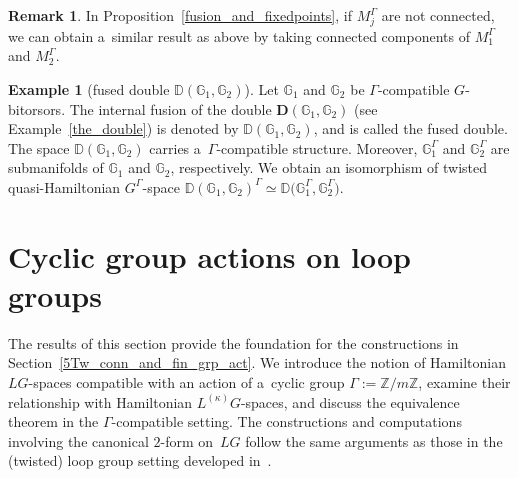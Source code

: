 \documentclass[10pt,a4paper]{amsart}
\numberwithin{equation}{section}
\theoremstyle{definition}
\newtheorem{Example}[Theorem]{Example}
\newtheorem{Remark}[Theorem]{Remark}
\newcommand{\bG}{\mathbb{G}}
\newcommand{\bD}{\mathbb{D}}
\newcommand{\bZ}{\mathbb{Z}}
\begin{document}
\begin{Remark}
 In Proposition~\ref{fusion_and_fixedpoints}, if $M_j^{\Gamma}$ are not connected, we can obtain a~similar result as above by taking connected components of $M_1^{\Gamma}$ and $M_2^{\Gamma}$.
\end{Remark}

\begin{Example}[fused double $\bD(\bG_1,\bG_2)$]
 Let $\bG_1$ and $\bG_2$ be $\Gamma$-compatible $G$-bitorsors.
 The internal fusion of the double $\textbf{D}(\bG_1,\bG_2)$ (see Example~\ref{the_double}) is denoted by $\bD(\bG_1,\bG_2)$, and is called the fused double.
 The space $\bD(\bG_1,\bG_2)$ carries a~$\Gamma$-compatible structure.
 Moreover, $\bG_1^{\Gamma}$ and $\bG_2^{\Gamma}$ are submanifolds of $\bG_1$ and $\bG_2$, respectively.
 We obtain an isomorphism of twisted quasi-Hamiltonian $G^{\Gamma}$-space
$\bD(\bG_1,\bG_2)^{\Gamma} \simeq \bD\bigl(\bG_1^{\Gamma},\bG_2^{\Gamma}\bigr)$.
\end{Example}

\section{Cyclic group actions on loop groups}\label{4Cyclic_grp_act}

The results of this section provide the foundation for the constructions in Section~\ref{5Tw_conn_and_fin_grp_act}.
We introduce the notion of Hamiltonian $LG$-spaces compatible with an action of a~cyclic group $\Gamma := \bZ/m\bZ$, examine their relationship with Hamiltonian $L^{(\kappa)}G$-spaces, and discuss the equivalence theorem in the $\Gamma$-compatible setting.
The constructions and computations involving the canonical $2$\nobreakdash-form on~$LG$ follow the same arguments as those in the (twisted) loop group setting developed in~\cite{AMM,LYM_twisted_LG}.
\end{document}

